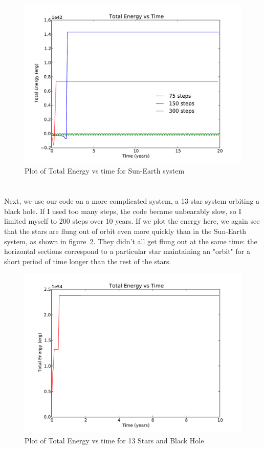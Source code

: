 \documentclass[11pt,letterpaper]{article}
\begin{document}
\begin{figure}[bth]
\centering
\includegraphics[width=\textwidth]{energy.pdf}
\caption{Plot of Total Energy vs time for Sun-Earth system}
\label{fig:sunearth}
\end{figure}



\section{}

Next, we use our code on a more complicated system, a 13-star system orbiting a black hole.
If I used too many steps, the code became unbearably slow, so I limited myself to 200 
steps over 10 years. If we plot the energy here, we again see that the stars are flung 
out of orbit even more quickly than in the Sun-Earth system, as shown in
figure~\ref{fig:stars}. They didn't all get flung out at the same time: the horizontal 
sections correspond to a particular star maintaining an "orbit" for a short period
of time longer than the rest of the stars.

\begin{figure}[bth]
\centering
\includegraphics[width=\textwidth]{energy_stars.pdf}
\caption{Plot of Total Energy vs time for 13 Stars and Black Hole}
\label{fig:stars}
\end{figure}
\end{document}
